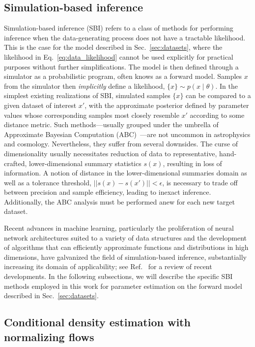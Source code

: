 \documentclass[prd,aps,10pt,nofootinbib,twocolumn,superscriptaddress,preprintnumbers,balancelastpage,longbibliography]{revtex4-1}
\begin{document}
\subsection{Simulation-based inference}

Simulation-based inference (SBI) refers to a class of methods for performing inference when the data-generating process does not have a tractable likelihood. This is the case for the model described in Sec.~\ref{sec:datasets}, where the likelihood in Eq.~\eqref{eq:data_likelihood} cannot be used explicitly for practical purposes without further simplifications. The model is then defined through a simulator as a probabilistic program, often knows as a forward model. Samples ${x}$ from the simulator then \emph{implicitly} define a likelihood, $\{x\}\sim p(x\mid\theta)$. In the simplest existing realizations of SBI, simulated samples $\{x\}$ can be compared to a given dataset of interest $x'$, with the approximate posterior defined by parameter values whose corresponding samples most closely resemble $x'$ according to some distance metric. Such methods---usually grouped under the umbrella of Approximate Bayesian Computation (ABC)~\cite{10.1214/aos/1176346785}---are not uncommon in astrophysics and cosmology. Nevertheless, they suffer from several downsides. The curse of dimensionality usually necessitates reduction of data to representative, hand-crafted, lower-dimensional summary statistics $s(x)$, resulting in loss of information. A notion of distance in the lower-dimensional summaries domain as well as a tolerance threshold, $||s(x) - s(x')|| < \epsilon$, is necessary to trade off between precision and sample efficiency, leading to inexact inference. Additionally, the ABC analysis must be performed anew for each new target dataset.

Recent advances in machine learning, particularly the proliferation of neural network architectures suited to a variety of data structures and the development of algorithms that can efficiently approximate functions and distributions in high dimensions, have galvanized the field of simulation-based inference, substantially increasing its domain of applicability; see Ref.~\cite{cranmer2020frontier} for a review of recent developments. In the following subsections, we will describe the specific SBI methods employed in this work for parameter estimation on the forward model described in Sec.~\ref{sec:datasets}.

\subsection{Conditional density estimation with normalizing flows}
\end{document}

